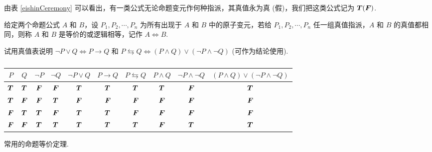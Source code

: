 由表 \ref{eishinCeremony} 可以看出，有一类公式无论命题变元作何种指派，其真值永为真 (假)，我们把这类公式记为 $\vb*{T}(\vb*{F})$.

\begin{definition}[命题等价]
    给定两个命题公式 $A$ 和 $B$，设 $P_1,P_2,\cdots,P_n$ 为所有出现于 $A$ 和 $B$ 中的原子变元，若给 $P_1,P_2,\cdots,P_n$ 任一组真值指派，$A$ 和 $B$ 的真值都相同，则称 $A$ 和 $B$ 是等价的或逻辑相等，记作 $A\Leftrightarrow B$.
\end{definition}

\begin{example}
    试用真值表说明 $\neg P\vee Q\Leftrightarrow P\to Q$ 和 $P\leftrightarrows Q\Leftrightarrow (P\wedge Q)\vee (\neg P\wedge \neg Q)$ (可作为结论使用).
    \label{negpveeq}
\end{example}
\begin{table}[H]
    \centering
    \caption{}
    \begin{tabular}{c | c | c | c | c | c | c | c | c | c}
        $P$       & $Q$       & $\neg P$  & $\neg Q$  & $\neg P\vee Q$ & $P\to Q$  & $P\leftrightarrows Q$ & $P\wedge Q$ & $\neg P\wedge \neg Q$ & $(P\wedge Q)\vee (\neg P\wedge \neg Q)$ \\
        \midrule
        $\vb*{T}$ & $\vb*{T}$ & $\vb*{F}$ & $\vb*{F}$ & $\vb*{T}$      & $\vb*{T}$ & $\vb*{T}$             & $\vb*{T}$   & $\vb*{F}$             & $\vb*{T}$                               \\
        \midrule
        $\vb*{T}$ & $\vb*{F}$ & $\vb*{F}$ & $\vb*{T}$ & $\vb*{F}$      & $\vb*{F}$ & $\vb*{F}$             & $\vb*{F}$   & $\vb*{F}$             & $\vb*{F}$                               \\
        \midrule
        $\vb*{F}$ & $\vb*{T}$ & $\vb*{T}$ & $\vb*{F}$ & $\vb*{T}$      & $\vb*{T}$ & $\vb*{F}$             & $\vb*{F}$   & $\vb*{F}$             & $\vb*{F}$                               \\
        \midrule
        $\vb*{F}$ & $\vb*{F}$ & $\vb*{T}$ & $\vb*{T}$ & $\vb*{T}$      & $\vb*{T}$ & $\vb*{T}$             & $\vb*{F}$   & $\vb*{T}$             & $\vb*{T}$                               \\
    \end{tabular}
\end{table}

常用的命题等价定理.

